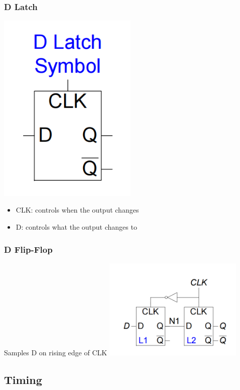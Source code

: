 \documentclass[12pt]{article}
\begin{document}
\subsubsection{D Latch}
\includegraphics[width=0.5\textwidth]{DLatch.png}
\begin{itemize}
    \item CLK: controls when the output changes
    \item D: controls what the output changes to 
\end{itemize}
\subsubsection{D Flip-Flop}
Samples D on rising edge of CLK
\includegraphics[width=0.5\textwidth]{DFlipFlop.png}

\subsection{Timing}
\end{document}
